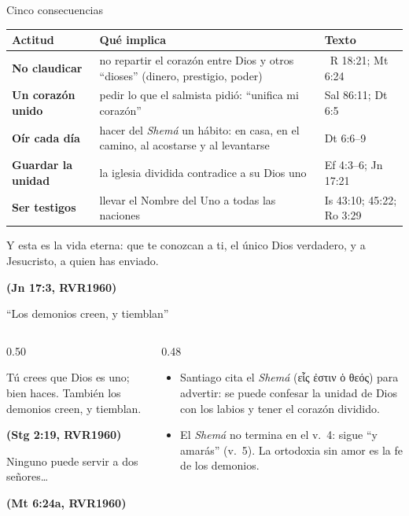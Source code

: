 \documentclass[hyperref={bookmarks=false},aspectratio=169]{beamer}
\newcommand{\grc}[1]{\foreignlanguage{ancientgreek}{#1}}
\newcommand{\fuente}[1]{\par\hfill{\upshape\bfseries\footnotesize\textcolor{azul}{#1}}}
\newcommand{\destacar}[1]{\textbf{\textcolor{azul}{#1}}}
\begin{document}
\begin{frame}{Cinco consecuencias}
\scriptsize\renewcommand{\arraystretch}{1.22}
\begin{tabular}{@{}>{\RaggedRight\arraybackslash}p{2.4cm}>{\RaggedRight\arraybackslash}p{6.2cm}>{\RaggedRight\arraybackslash}p{3.3cm}@{}}
\toprule
\textbf{Actitud} & \textbf{Qué implica} & \textbf{Texto} \\ \midrule
\destacar{No claudicar} & no repartir el corazón entre Dios y otros ``dioses'' (dinero, prestigio, poder) & 1~R 18:21; Mt 6:24 \\
\destacar{Un corazón unido} & pedir lo que el salmista pidió: ``unifica mi corazón'' & Sal 86:11; Dt 6:5 \\
\destacar{Oír cada día} & hacer del \emph{Shemá} un hábito: en casa, en el camino, al acostarse y al levantarse & Dt 6:6--9 \\
\destacar{Guardar la unidad} & la iglesia dividida contradice a su Dios uno & Ef 4:3--6; Jn 17:21 \\
\destacar{Ser testigos} & llevar el Nombre del Uno a todas las naciones & Is 43:10; 45:22; Ro 3:29 \\
\bottomrule
\end{tabular}\par\medskip
\begin{cita}Y esta es la vida eterna: que te conozcan a ti, el único Dios verdadero, y a Jesucristo, a quien has enviado.\fuente{(Jn 17:3, RVR1960)}\end{cita}
\end{frame}

\begin{frame}{``Los demonios creen, y tiemblan''}
\begin{columns}[c,onlytextwidth]
\begin{column}{0.50\textwidth}
\begin{cita}Tú crees que Dios es uno; bien haces. También los demonios creen, y tiemblan.\fuente{(Stg 2:19, RVR1960)}\end{cita}
\begin{cita}[fontupper=\scriptsize\itshape]Ninguno puede servir a dos señores\ldots{}\fuente{(Mt 6:24a, RVR1960)}\end{cita}
\end{column}
\begin{column}{0.48\textwidth}\small
\begin{itemize}
\item Santiago cita el \emph{Shemá} (\grc{εἷς ἐστιν ὁ θεός}) para advertir: se puede confesar la unidad de Dios con los labios y tener el corazón dividido.
\item El \emph{Shemá} no termina en el v.~4: sigue ``y amarás'' (v.~5). La ortodoxia sin amor es la fe de los demonios.
\end{itemize}
\end{column}
\end{columns}
\end{frame}
\end{document}
